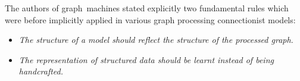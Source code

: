 The authors of graph~machines stated explicitly two fundamental rules which were before implicitly applied in various graph processing connectionist models:
\begin{itemize}
	\item \emph{The structure of a model should reflect the structure of the processed graph.}
	\item \emph{The representation of structured data should be learnt instead of being handcrafted.~\cite{goulon2005hopfield}} 
\end{itemize}
